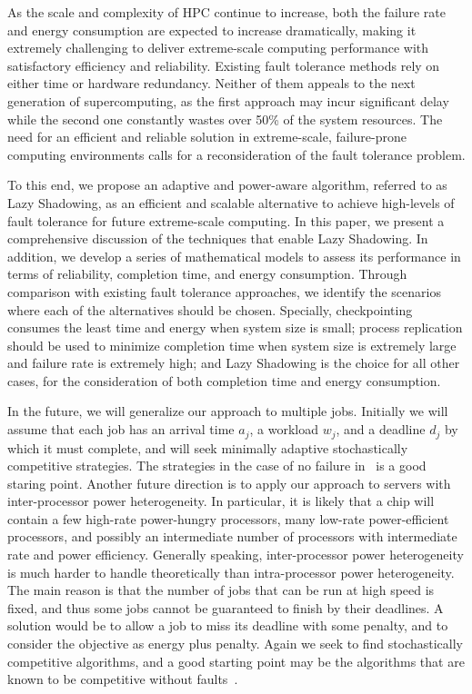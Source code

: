 As the scale and complexity of HPC continue to increase, both the failure rate and energy consumption are expected to increase dramatically, making it extremely challenging to deliver extreme-scale computing performance with satisfactory efficiency and reliability. Existing fault tolerance methods rely on either time or hardware redundancy. Neither of them appeals to the next generation of supercomputing, as the first approach may incur significant delay while the second one constantly wastes over 50\% of the system resources. The need for an efficient and reliable solution in extreme-scale, failure-prone computing environments calls for a reconsideration of the fault tolerance problem. 

To this end, we propose an adaptive and power-aware algorithm, referred to as Lazy Shadowing, as an efficient and scalable alternative to achieve high-levels of fault tolerance for future extreme-scale computing. In this paper, we present a comprehensive discussion of the techniques that enable Lazy Shadowing. In addition, we develop a series of mathematical models to assess its performance in terms of reliability, completion time, and energy consumption. 
Through comparison with existing fault tolerance approaches, we identify the scenarios where each of the alternatives should be chosen. Specially, checkpointing consumes the least time and energy when system size is small; process replication should be used to minimize completion time when system size is extremely large and failure rate is extremely high; and Lazy Shadowing is the choice for all other cases, for the consideration of both completion time and energy consumption. 

In the future, we will generalize our approach to multiple jobs. Initially we will assume that each job has an arrival time $a_j$, a workload $w_j$, and a deadline $d_j$ by which it must complete, and will seek minimally adaptive stochastically competitive strategies. The strategies in the case of no failure in~\cite{Albers:2011:MSS:1989493.1989539} is a good staring point. Another future direction is to apply our approach to servers with inter-processor power heterogeneity. In particular, it is likely that a chip will contain a few high-rate power-hungry processors, many low-rate power-efficient processors, and possibly an intermediate number of processors with intermediate rate and power efficiency. Generally speaking, inter-processor power heterogeneity is much harder to handle theoretically than intra-processor power heterogeneity. The main reason is that the number of jobs that can be run at high speed is fixed, and thus some jobs cannot be guaranteed to finish by their deadlines. A solution would be to allow a job to miss its deadline with some penalty, and to consider the objective as energy plus penalty. Again we seek to find stochastically competitive algorithms, and a good starting point may be the algorithms that are known to be competitive without faults~\cite{Kling:2013:PSM:2486159.2486183}.

